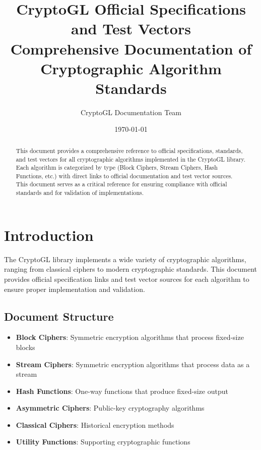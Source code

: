 \documentclass[12pt,a4paper]{article}
\begin{document}
\title{\Huge\textbf{CryptoGL Official Specifications and Test Vectors}\\
\large Comprehensive Documentation of Cryptographic Algorithm Standards}
\author{CryptoGL Documentation Team}
\date{\today}

\maketitle

\begin{abstract}
This document provides a comprehensive reference to official specifications, standards, and test vectors for all cryptographic algorithms implemented in the CryptoGL library. Each algorithm is categorized by type (Block Ciphers, Stream Ciphers, Hash Functions, etc.) with direct links to official documentation and test vector sources. This document serves as a critical reference for ensuring compliance with official standards and for validation of implementations.
\end{abstract}

\tableofcontents
\newpage

\section{Introduction}

The CryptoGL library implements a wide variety of cryptographic algorithms, ranging from classical ciphers to modern cryptographic standards. This document provides official specification links and test vector sources for each algorithm to ensure proper implementation and validation.

\subsection{Document Structure}
\begin{itemize}
    \item \textbf{Block Ciphers}: Symmetric encryption algorithms that process fixed-size blocks
    \item \textbf{Stream Ciphers}: Symmetric encryption algorithms that process data as a stream
    \item \textbf{Hash Functions}: One-way functions that produce fixed-size output
    \item \textbf{Asymmetric Ciphers}: Public-key cryptography algorithms
    \item \textbf{Classical Ciphers}: Historical encryption methods
    \item \textbf{Utility Functions}: Supporting cryptographic functions
\end{itemize}
\end{document}
